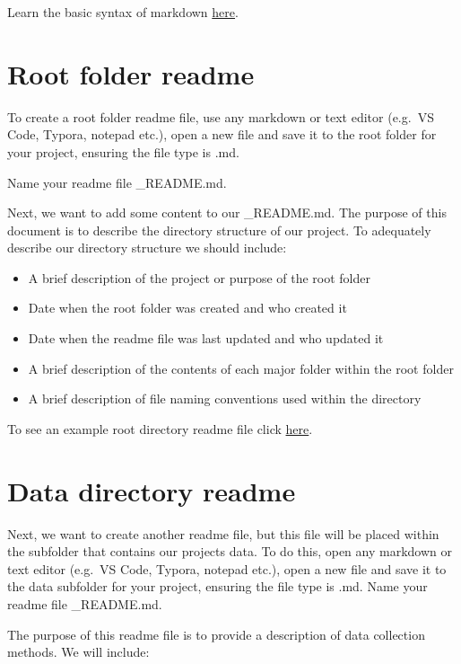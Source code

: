\documentclass[
]{book}
\providecommand{\tightlist}{%
  \setlength{\itemsep}{0pt}\setlength{\parskip}{0pt}}
\begin{document}
Learn the basic syntax of markdown \href{https://ubco-biology.github.io/Procedures-and-Guidelines/markdown-1.html}{here}.

\hypertarget{root-folder-readme}{%
\section{Root folder readme}\label{root-folder-readme}}

To create a root folder readme file, use any markdown or text editor (e.g.~VS Code, Typora, notepad etc.), open a new file and save it to the root folder for your project, ensuring the file type is .md.

Name your readme file \_README.md.

Next, we want to add some content to our \_README.md. The purpose of this document is to describe the directory structure of our project. To adequately describe our directory structure we should include:

\begin{itemize}
\tightlist
\item
  A brief description of the project or purpose of the root folder
\item
  Date when the root folder was created and who created it
\item
  Date when the readme file was last updated and who updated it
\item
  A brief description of the contents of each major folder within the root folder
\item
  A brief description of file naming conventions used within the directory
\end{itemize}

To see an example root directory readme file click \href{files/DS_rootREADME.md}{here}.

\hypertarget{data-directory-readme}{%
\section{Data directory readme}\label{data-directory-readme}}

Next, we want to create another readme file, but this file will be placed within the subfolder that contains our project\textquotesingle s data. To do this, open any markdown or text editor (e.g.~VS Code, Typora, notepad etc.), open a new file and save it to the data subfolder for your project, ensuring the file type is .md. Name your readme file \_README.md.

The purpose of this readme file is to provide a description of data collection methods. We will include:
\end{document}
